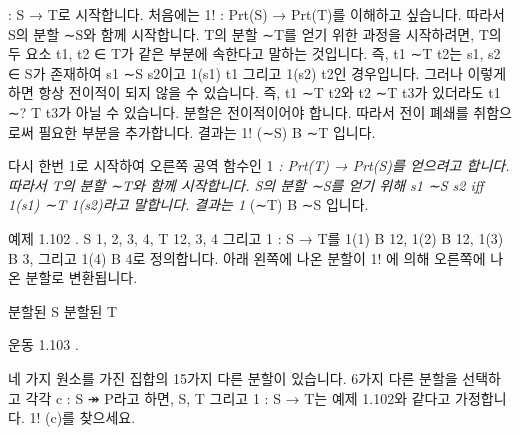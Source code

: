 \documentclass[11pt, a4paper, twoside, openany]{book}
\begin{document}
\par{} : S → T\hspace{0pt}로 시작합니다. 처음에는 1! : Prt(S) → Prt(T)를 이해하고 싶습니다. 따라서 S\hspace{0pt}의 분할 ∼S\hspace{0pt}와 함께 시작합니다. T\hspace{0pt}의 분할 ∼T\hspace{0pt}를 얻기 위한 과정을 시작하려면, T\hspace{0pt}의 두 요소 t1, t2 ∈ T\hspace{0pt}가 같은 부분에 속한다고 말하는 것입니다. 즉, t1 ∼T t2\hspace{0pt}는 s1, s2 ∈ S\hspace{0pt}가 존재하여 s1 ∼S s2\hspace{0pt}이고 1(s1)  t1 그리고 1(s2)  t2\hspace{0pt}인 경우입니다. 그러나 이렇게 하면 항상 전이적이 되지 않을 수 있습니다. 즉, t1 ∼T t2\hspace{0pt}와 t2 ∼T t3\hspace{0pt}가 있더라도 t1 ∼? T t3\hspace{0pt}가 아닐 수 있습니다. 분할은 전이적이어야 합니다. 따라서 전이 폐쇄를 취함으로써 필요한 부분을 추가합니다. 결과는 1! (∼S) B ∼T 입니다.

\par\medskip
다시 한번 1\hspace{0pt}로 시작하여 오른쪽 공역 함수인 1\textit{ : Prt(T) → Prt(S)를 얻으려고 합니다. 따라서 T\hspace{0pt}의 분할 ∼T\hspace{0pt}와 함께 시작합니다. S\hspace{0pt}의 분할 ∼S\hspace{0pt}를 얻기 위해 s1 ∼S s2 iﬀ 1(s1) ∼T 1(s2)라고 말합니다. 결과는 1} (∼T) B ∼S 입니다.

\par\medskip
예제 1.102 . S  {1, 2, 3, 4}, T  {12, 3, 4} 그리고 1 : S → T\hspace{0pt}를 1(1) B 12, 1(2) B 12, 1(3) B 3, 그리고 1(4) B 4\hspace{0pt}로 정의합니다. 아래 왼쪽에 나온 분할이 1! 에 의해 오른쪽에 나온 분할로 변환됩니다.

\par\medskip
분할된 S
분할된 T

\par\medskip
운동 1.103 .

\par\medskip
네 가지 원소를 가진 집합의 15\hspace{0pt}가지 다른 분할이 있습니다. 6\hspace{0pt}가지 다른 분할을 선택하고 각각 c : S ↠ P\hspace{0pt}라고 하면, S, T 그리고 1 : S → T\hspace{0pt}는 예제 1.102\hspace{0pt}와 같다고 가정합니다. 1! (c)를 찾으세요.
\end{document}
